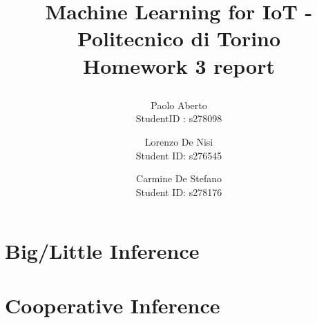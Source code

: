 \documentclass{article}
\date{}
\begin{document}
\author{Paolo Aberto\\
StudentID : s278098\\

\and
Lorenzo De Nisi\\
Student ID: s276545\\

\and
Carmine De Stefano\\
Student ID: s278176\\
}

\justifying

\title{
    \vspace{0.8cm}
    
    Machine Learning for IoT - 
    Politecnico di Torino\\
    \vspace{.5cm}
    \Large \textbf{Homework 3 report}
    \vspace{.1cm}
}

\maketitle
\thispagestyle{empty} 
\vspace{-0.9cm}


\section{Big/Little Inference}


\section{Cooperative Inference}
\end{document}
